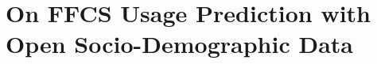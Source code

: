 
\chapter{On FFCS Usage Prediction with Open Socio-Demographic Data}
\label{chap:8_prediction}
	\graphicspath{{Chapter8/}}















